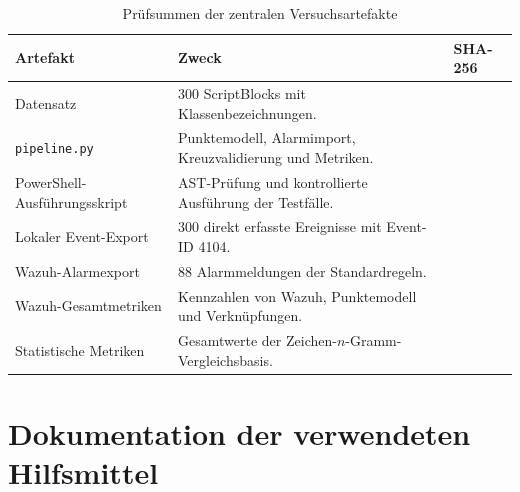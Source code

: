 \documentclass[12pt,a4paper,oneside,parskip=half]{scrreprt}
\renewcommand{\arraystretch}{1.25}
\begin{document}
\begingroup
\small
\setlength{\tabcolsep}{4pt}
\renewcommand{\arraystretch}{1.16}
\begin{table}[H]
\centering
\caption{Prüfsummen der zentralen Versuchsartefakte}
\label{tab:artifact-hashes}
\begin{tabular}{|L{3.5cm}|L{4.0cm}|L{5.4cm}|}
\hline
\textbf{Artefakt} & \textbf{Zweck} & \textbf{SHA-256}\\
\hline
Datensatz & 300 ScriptBlocks mit Klassenbezeichnungen. & \\
\hline
\texttt{pipeline.py} & Punktemodell, Alarmimport, Kreuzvalidierung und Metriken. & \\
\hline
PowerShell-Ausführungsskript & AST-Prüfung und kontrollierte Ausführung der Testfälle. & \\
\hline
Lokaler Event-Export & 300 direkt erfasste Ereignisse mit Event-ID 4104. & \\
\hline
Wazuh-Alarmexport & 88 Alarmmeldungen der Standardregeln. & \\
\hline
Wazuh-Gesamtmetriken & Kennzahlen von Wazuh, Punktemodell und Verknüpfungen. & \\
\hline
Statistische Metriken & Gesamtwerte der Zeichen-\(n\)-Gramm-Vergleichsbasis. & \\
\hline
\end{tabular}
\end{table}
\endgroup

\clearpage\chapter*{Dokumentation der verwendeten Hilfsmittel}
\end{document}
